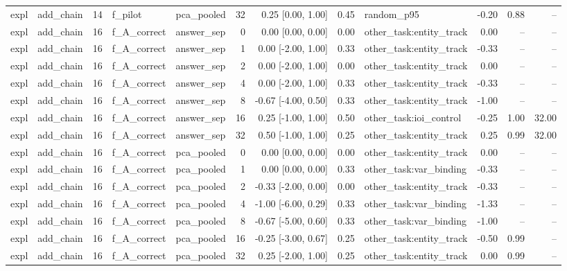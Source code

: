 \begin{tabular}{llrllrrrlrrr}
expl & add\_chain & 14 & f\_pilot & pca\_pooled & 32 & 0.25 [0.00, 1.00] & 0.45 & random\_p95 & -0.20 & 0.88 & -- \\
expl & add\_chain & 16 & f\_A\_correct & answer\_sep & 0 & 0.00 [0.00, 0.00] & 0.00 & other\_task:entity\_track & 0.00 & -- & -- \\
expl & add\_chain & 16 & f\_A\_correct & answer\_sep & 1 & 0.00 [-2.00, 1.00] & 0.33 & other\_task:entity\_track & -0.33 & -- & -- \\
expl & add\_chain & 16 & f\_A\_correct & answer\_sep & 2 & 0.00 [-2.00, 1.00] & 0.00 & other\_task:entity\_track & 0.00 & -- & -- \\
expl & add\_chain & 16 & f\_A\_correct & answer\_sep & 4 & 0.00 [-2.00, 1.00] & 0.33 & other\_task:entity\_track & -0.33 & -- & -- \\
expl & add\_chain & 16 & f\_A\_correct & answer\_sep & 8 & -0.67 [-4.00, 0.50] & 0.33 & other\_task:entity\_track & -1.00 & -- & -- \\
expl & add\_chain & 16 & f\_A\_correct & answer\_sep & 16 & 0.25 [-1.00, 1.00] & 0.50 & other\_task:ioi\_control & -0.25 & 1.00 & 32.00 \\
expl & add\_chain & 16 & f\_A\_correct & answer\_sep & 32 & 0.50 [-1.00, 1.00] & 0.25 & other\_task:entity\_track & 0.25 & 0.99 & 32.00 \\
expl & add\_chain & 16 & f\_A\_correct & pca\_pooled & 0 & 0.00 [0.00, 0.00] & 0.00 & other\_task:entity\_track & 0.00 & -- & -- \\
expl & add\_chain & 16 & f\_A\_correct & pca\_pooled & 1 & 0.00 [0.00, 0.00] & 0.33 & other\_task:var\_binding & -0.33 & -- & -- \\
expl & add\_chain & 16 & f\_A\_correct & pca\_pooled & 2 & -0.33 [-2.00, 0.00] & 0.00 & other\_task:entity\_track & -0.33 & -- & -- \\
expl & add\_chain & 16 & f\_A\_correct & pca\_pooled & 4 & -1.00 [-6.00, 0.29] & 0.33 & other\_task:var\_binding & -1.33 & -- & -- \\
expl & add\_chain & 16 & f\_A\_correct & pca\_pooled & 8 & -0.67 [-5.00, 0.60] & 0.33 & other\_task:var\_binding & -1.00 & -- & -- \\
expl & add\_chain & 16 & f\_A\_correct & pca\_pooled & 16 & -0.25 [-3.00, 0.67] & 0.25 & other\_task:entity\_track & -0.50 & 0.99 & -- \\
expl & add\_chain & 16 & f\_A\_correct & pca\_pooled & 32 & 0.25 [-2.00, 1.00] & 0.25 & other\_task:entity\_track & 0.00 & 0.99 & -- \\

\end{tabular}

